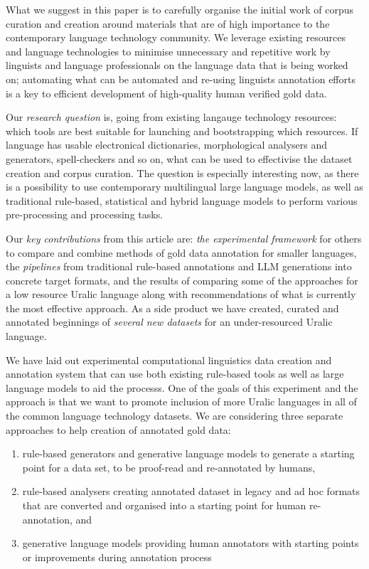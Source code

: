 \documentclass[free]{flammie}
\begin{document}
What we suggest in this paper is to carefully organise the initial work of
corpus curation and creation around materials that are of high importance to the
contemporary language technology community.  We leverage existing resources and
language technologies to minimise unnecessary and repetitive work by linguists
and language professionals on the language data that is being worked on;
automating what can be automated and re-using linguists annotation efforts is a
key to efficient development of high-quality human verified gold data.

Our \textit{research question} is, going from existing langauge technology
resources: which tools are best suitable for launching and bootstrapping which
resources. If language has usable electronical dictionaries, morphological
analysers and generators, spell-checkers and so on, what can be used to
effectivise the dataset creation and corpus curation. The question is especially
interesting now, as there is a possibility to use contemporary multilingual
large language models, as well as traditional rule-based, statistical and hybrid
language models to perform various pre-processing and processing tasks.

Our \textit{key contributions} from this article are: \textit{the experimental
framework} for others to compare and combine methods of gold data annotation for
smaller languages, the \textit{pipelines} from traditional rule-based
annotations and LLM generations into concrete target formats, and the results of
comparing some of the approaches for a low resource Uralic language along with
recommendations of what is currently the most effective approach. As a side
product we have created, curated and annotated beginnings of \textit{several new
datasets} for an under-resourced Uralic language.

We have laid out experimental computational linguistics data creation and
annotation system that can use both existing rule-based tools as well as large
language models to aid the processs.  One of the goals of this experiment and
the approach is that we want to promote inclusion of more Uralic languages in
all of the common language technology datasets.  We are considering three
separate approaches to help creation of annotated gold data:

\begin{enumerate}
    \item rule-based generators and generative language models to generate a
        starting point for a data set, to be proof-read and re-annotated by
        humans,
    \item rule-based analysers creating annotated dataset in legacy and ad hoc
        formats that are converted and organised into a starting point for human
        re-annotation, and
    \item generative language models providing human annotators with starting
        points or improvements during annotation process
\end{enumerate}
\end{document}
